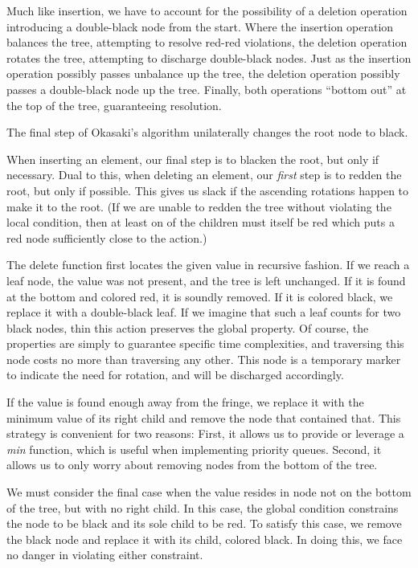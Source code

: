 \documentclass[preprint]{sigplanconf}
\begin{document}

Much like insertion, we have to account for the possibility of a deletion operation introducing a double-black node from the start. Where the insertion operation balances the tree, attempting to resolve red-red violations, the deletion operation rotates the tree, attempting to discharge double-black nodes. Just as the insertion operation possibly passes unbalance up the tree, the deletion operation possibly passes a double-black node up the tree. Finally, both operations ``bottom out'' at the top of the tree, guaranteeing resolution.

The final step of Okasaki's algorithm unilaterally changes the root node to black. 

When inserting an element, our final step is to blacken the root, but only if necessary. Dual to this, when deleting an element, our \emph{first} step is to redden the root, but only if possible. This gives us slack if the ascending rotations happen to make it to the root. (If we are unable to redden the tree without violating the local condition, then at least on of the children must itself be red which puts a red node sufficiently close to the action.)

The delete function first locates the given value in recursive fashion. If we reach a leaf node, the value was not present, and the tree is left unchanged. If it is found at the bottom and colored red, it is soundly removed. If it is colored black, we replace it with a double-black leaf. If we imagine that such a leaf counts for two black nodes, thin this action preserves the global property. Of course, the properties are simply to guarantee specific time complexities, and traversing this node costs no more than traversing any other. This node is a temporary marker to indicate the need for rotation, and will be discharged accordingly.

If the value is found enough away from the fringe, we replace it with the minimum value of its right child and remove the node that contained that. This strategy is convenient for two reasons: First, it allows us to provide or leverage a \emph{min} function, which is useful when implementing priority queues. Second, it allows us to only worry about removing nodes from the bottom of the tree.

We must consider the final case when the value resides in node not on the bottom of the tree, but with no right child. In this case, the global condition constrains the node to be black and its sole child to be red. To satisfy this case, we remove the black node and replace it with its child, colored black. In doing this, we face no danger in violating either constraint.
\end{document}
